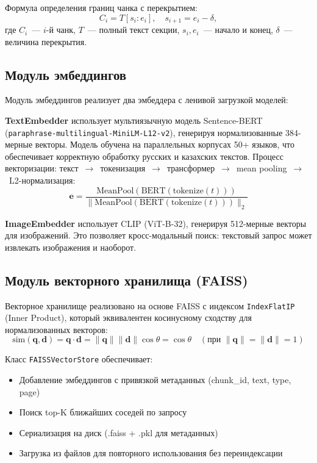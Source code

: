 \documentclass[a4paper,12pt]{article}
\begin{document}
Формула определения границ чанка с перекрытием:
\[
C_i = T[s_i : e_i], \quad s_{i+1} = e_i - \delta,
\]
где $C_i$~--- $i$-й чанк, $T$~--- полный текст секции, $s_i, e_i$~--- начало и конец, $\delta$~--- величина перекрытия.

\subsection{Модуль эмбеддингов}

Модуль эмбеддингов реализует два эмбеддера с ленивой загрузкой моделей:

\textbf{TextEmbedder} использует мультиязычную модель Sentence-BERT (\texttt{paraphrase\hbox{-}multilingual\hbox{-}MiniLM\hbox{-}L12\hbox{-}v2}), генерируя нормализованные 384-мерные векторы. Модель обучена на параллельных корпусах 50+ языков, что обеспечивает корректную обработку русских и казахских текстов. Процесс векторизации: текст~$\rightarrow$~токенизация~$\rightarrow$~трансформер~$\rightarrow$~mean pooling~$\rightarrow$~L2-нормализация:
\[
\mathbf{e} = \frac{\text{MeanPool}(\text{BERT}(\text{tokenize}(t)))}{\|\text{MeanPool}(\text{BERT}(\text{tokenize}(t)))\|_2}
\]

\textbf{ImageEmbedder} использует CLIP (ViT-B-32), генерируя 512-мерные векторы для изображений. Это позволяет кросс-модальный поиск: текстовый запрос может извлекать изображения и наоборот.

\subsection{Модуль векторного хранилища (FAISS)}

Векторное хранилище реализовано на основе FAISS с индексом \texttt{IndexFlatIP} (Inner Product), который эквивалентен косинусному сходству для нормализованных векторов:
\[
\text{sim}(\mathbf{q}, \mathbf{d}) = \mathbf{q} \cdot \mathbf{d} = \|\mathbf{q}\| \|\mathbf{d}\| \cos\theta = \cos\theta \quad (\text{при } \|\mathbf{q}\|=\|\mathbf{d}\|=1)
\]

Класс \texttt{FAISSVectorStore} обеспечивает:
\begin{itemize}
    \item Добавление эмбеддингов с привязкой метаданных (chunk\_id, text, type, page)
    \item Поиск top-K ближайших соседей по запросу
    \item Сериализация на диск (.faiss + .pkl для метаданных)
    \item Загрузка из файлов для повторного использования без переиндексации
\end{itemize}
\end{document}
